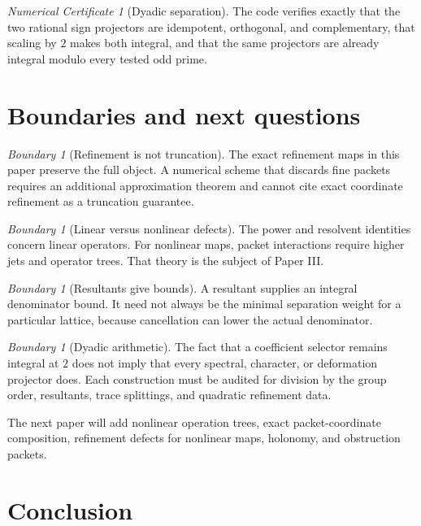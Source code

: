 \documentclass[11pt]{article}
\theoremstyle{definition}
\theoremstyle{remark}
\newtheorem{boundary}[theorem]{Boundary}
\newtheorem{certificate}[theorem]{Numerical Certificate}
\begin{document}
\begin{certificate}[Dyadic separation]
The code verifies exactly that the two rational sign projectors are idempotent, orthogonal, and complementary, that scaling by $2$ makes both integral, and that the same projectors are already integral modulo every tested odd prime.
\end{certificate}

\section{Boundaries and next questions}

\begin{boundary}[Refinement is not truncation]
The exact refinement maps in this paper preserve the full object. A numerical scheme that discards fine packets requires an additional approximation theorem and cannot cite exact coordinate refinement as a truncation guarantee.
\end{boundary}

\begin{boundary}[Linear versus nonlinear defects]
The power and resolvent identities concern linear operators. For nonlinear maps, packet interactions require higher jets and operator trees. That theory is the subject of Paper III.
\end{boundary}

\begin{boundary}[Resultants give bounds]
A resultant supplies an integral denominator bound. It need not always be the minimal separation weight for a particular lattice, because cancellation can lower the actual denominator.
\end{boundary}

\begin{boundary}[Dyadic arithmetic]
The fact that a coefficient selector remains integral at $2$ does not imply that every spectral, character, or deformation projector does. Each construction must be audited for division by the group order, resultants, trace splittings, and quadratic refinement data.
\end{boundary}

The next paper will add nonlinear operation trees, exact packet-coordinate composition, refinement defects for nonlinear maps, holonomy, and obstruction packets.

\section{Conclusion}
\end{document}
